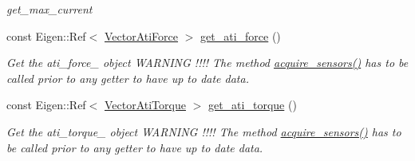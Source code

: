 \begin{DoxyCompactItemize}
\begin{DoxyCompactList}\small\item\em get\+\_\+max\+\_\+current \end{DoxyCompactList}\item 
const Eigen\+::\+Ref$<$ \hyperlink{classblmc__robots_1_1Teststand_a51f17cf2b01dd8252e21db97b486e067}{Vector\+Ati\+Force} $>$ \hyperlink{classblmc__robots_1_1Teststand_af4bf3a4692fdeacdad78a7213c3fbe98}{get\+\_\+ati\+\_\+force} ()
\begin{DoxyCompactList}\small\item\em Get the ati\+\_\+force\+\_\+ object W\+A\+R\+N\+I\+NG !!!! The method \hyperlink{classblmc__robots_1_1Teststand_a4203e25148ab5b4ddfef3b46647213c6}{acquire\+\_\+sensors()} has to be called prior to any getter to have up to date data. \end{DoxyCompactList}\item 
const Eigen\+::\+Ref$<$ \hyperlink{classblmc__robots_1_1Teststand_a466977786f9b007854fa2eb2a97b0de9}{Vector\+Ati\+Torque} $>$ \hyperlink{classblmc__robots_1_1Teststand_a27ba45a099b4ff6852f5acd0226aa915}{get\+\_\+ati\+\_\+torque} ()
\begin{DoxyCompactList}\small\item\em Get the ati\+\_\+torque\+\_\+ object W\+A\+R\+N\+I\+NG !!!! The method \hyperlink{classblmc__robots_1_1Teststand_a4203e25148ab5b4ddfef3b46647213c6}{acquire\+\_\+sensors()} has to be called prior to any getter to have up to date data. \end{DoxyCompactList}\end{DoxyCompactItemize}
